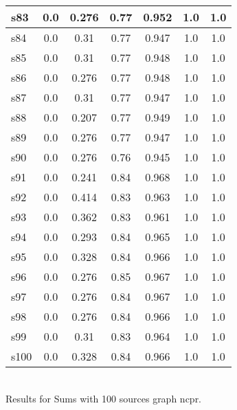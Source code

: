 \documentclass{article}
\begin{document}
\begin{tabular}{|l|c|c|c|c|c|c|}
s83 &0.0 & 0.276 & 0.77 & 0.952 & 1.0 & 1.0\\
\hline
s84 &0.0 & 0.31 & 0.77 & 0.947 & 1.0 & 1.0\\
\hline
s85 &0.0 & 0.31 & 0.77 & 0.948 & 1.0 & 1.0\\
\hline
s86 &0.0 & 0.276 & 0.77 & 0.948 & 1.0 & 1.0\\
\hline
s87 &0.0 & 0.31 & 0.77 & 0.947 & 1.0 & 1.0\\
\hline
s88 &0.0 & 0.207 & 0.77 & 0.949 & 1.0 & 1.0\\
\hline
s89 &0.0 & 0.276 & 0.77 & 0.947 & 1.0 & 1.0\\
\hline
s90 &0.0 & 0.276 & 0.76 & 0.945 & 1.0 & 1.0\\
\hline
s91 &0.0 & 0.241 & 0.84 & 0.968 & 1.0 & 1.0\\
\hline
s92 &0.0 & 0.414 & 0.83 & 0.963 & 1.0 & 1.0\\
\hline
s93 &0.0 & 0.362 & 0.83 & 0.961 & 1.0 & 1.0\\
\hline
s94 &0.0 & 0.293 & 0.84 & 0.965 & 1.0 & 1.0\\
\hline
s95 &0.0 & 0.328 & 0.84 & 0.966 & 1.0 & 1.0\\
\hline
s96 &0.0 & 0.276 & 0.85 & 0.967 & 1.0 & 1.0\\
\hline
s97 &0.0 & 0.276 & 0.84 & 0.967 & 1.0 & 1.0\\
\hline
s98 &0.0 & 0.276 & 0.84 & 0.966 & 1.0 & 1.0\\
\hline
s99 &0.0 & 0.31 & 0.83 & 0.964 & 1.0 & 1.0\\
\hline
s100 &0.0 & 0.328 & 0.84 & 0.966 & 1.0 & 1.0\\
\hline
\end{tabular}\\

\noindent Results for Sums with 100 sources graph ncpr.
\end{document}

